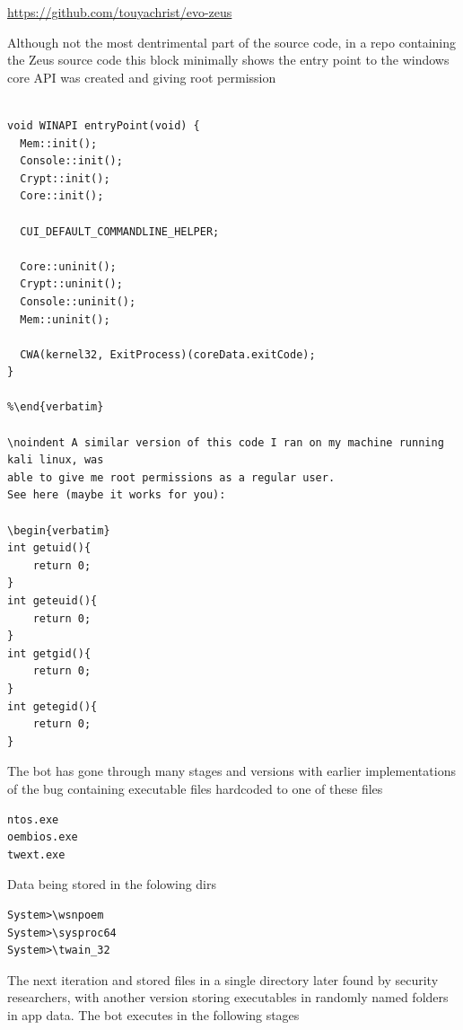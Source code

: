\documentclass[12pt, letterpaper]{article}
\begin{document}
\begin{sloppypar}
\url{https://github.com/touyachrist/evo-zeus}

\noindent Although not the most dentrimental part of the source code, in a repo
containing the Zeus source code this block minimally shows the entry
point to the windows core API was created and giving root permission

\begin{verbatim}

void WINAPI entryPoint(void) {
  Mem::init();
  Console::init();  
  Crypt::init();
  Core::init();
  
  CUI_DEFAULT_COMMANDLINE_HELPER;

  Core::uninit();
  Crypt::uninit();
  Console::uninit();
  Mem::uninit();
  
  CWA(kernel32, ExitProcess)(coreData.exitCode);
}

%\end{verbatim}

\noindent A similar version of this code I ran on my machine running kali linux, was 
able to give me root permissions as a regular user. 
See here (maybe it works for you):

\begin{verbatim}
int getuid(){
    return 0;
}
int geteuid(){
    return 0;
}
int getgid(){
    return 0;
}
int getegid(){
    return 0;
}
\end{verbatim}

\noindent The bot has gone through many stages and versions with earlier 
implementations of the bug containing executable files hardcoded to one 
of these files

\begin{verbatim}
ntos.exe
oembios.exe
twext.exe
\end{verbatim}

\noindent Data being stored in the folowing dirs

\begin{verbatim}
System>\wsnpoem 
System>\sysproc64
System>\twain_32
\end{verbatim}

The next iteration and stored files in a single directory later found by
security researchers, with another version storing executables in
randomly named folders in app data. The bot executes in the following stages


\end{sloppypar}
\end{document}
